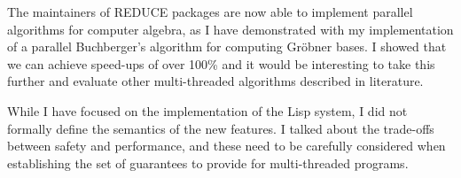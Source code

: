 The maintainers of REDUCE packages are now able to implement parallel algorithms
for computer algebra, as I have demonstrated with my implementation of
a parallel Buchberger's algorithm for computing Gröbner bases. I showed that
we can achieve speed-ups of over 100\% and it would be interesting to take
this further and evaluate other multi-threaded algorithms described in literature.

While I have focused on the implementation of the Lisp system, I did not formally define
the semantics of the new features. I talked about the trade-offs between safety and performance,
and these need to be carefully considered when establishing the set of guarantees to
provide for multi-threaded programs.